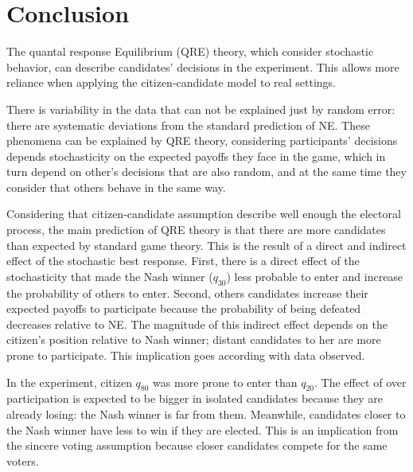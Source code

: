 \chapter{Conclusion}

The quantal response Equilibrium (QRE) theory, which consider stochastic behavior, can describe candidates' decisions in the experiment. This allows more reliance when applying the citizen-candidate model to real settings.

There is variability in the data that can not be explained just by random error: there are systematic deviations from the standard prediction of NE. 
These phenomena can be explained by QRE theory, considering participants' decisions depends stochasticity on the expected payoffs they face in the game, which in turn depend on other's decisions that are also random, and at the same time they consider that others behave in the same way. %


Considering that citizen-candidate assumption describe well enough the electoral process, the main prediction of QRE theory is that there are more candidates than expected by standard game theory. %
This is the result of a direct and indirect effect of the stochastic best response. %
First, there is a direct effect of the stochasticity that made the Nash winner ($q_{30}$) less probable to enter and increase the probability of others to enter. 
Second, others candidates increase their expected payoffs to participate because the probability of being defeated decreases relative to NE. %
The magnitude of this indirect effect depends on the citizen's position relative to Nash winner; distant candidates to her are more prone to participate. This implication goes according with data observed.

In the experiment, citizen $q_{80}$ was more prone to enter than $q_{20}$. 
The effect of over participation is expected to be bigger in isolated candidates because they are already losing: the Nash winner is far from them. Meanwhile, candidates closer to the Nash winner have less to win if they are elected. 
This is an implication from the sincere voting assumption because closer candidates compete for the same voters.%

